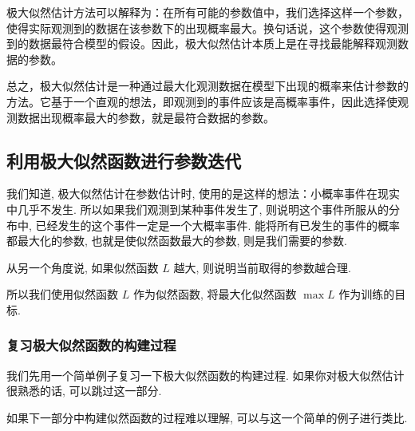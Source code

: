 极大似然估计方法可以解释为：在所有可能的参数值中，我们选择这样一个参数，使得实际观测到的数据在该参数下的出现概率最大。换句话说，这个参数使得观测到的数据最符合模型的假设。因此，极大似然估计本质上是在寻找最能解释观测数据的参数。

总之，极大似然估计是一种通过最大化观测数据在模型下出现的概率来估计参数的方法。它基于一个直观的想法，即观测到的事件应该是高概率事件，因此选择使观测数据出现概率最大的参数，就是最符合数据的参数。

\subsection{利用极大似然函数进行参数迭代}

我们知道, 极大似然估计在参数估计时, 使用的是这样的想法：小概率事件在现实中几乎不发生. 所以如果我们观测到某种事件发生了, 则说明这个事件所服从的分布中, 已经发生的这个事件一定是一个大概率事件. 能将所有已发生的事件的概率都最大化的参数, 也就是使似然函数最大的参数, 则是我们需要的参数.

从另一个角度说, 如果似然函数 $L$ 越大, 则说明当前取得的参数越合理.  

所以我们使用似然函数 $L$ 作为似然函数, 将最大化似然函数 $\max L$ 作为训练的目标. 

\subsubsection{复习极大似然函数的构建过程}

我们先用一个简单例子复习一下极大似然函数的构建过程. 如果你对极大似然估计很熟悉的话, 可以跳过这一部分. 

如果下一部分中构建似然函数的过程难以理解, 可以与这一个简单的例子进行类比.


